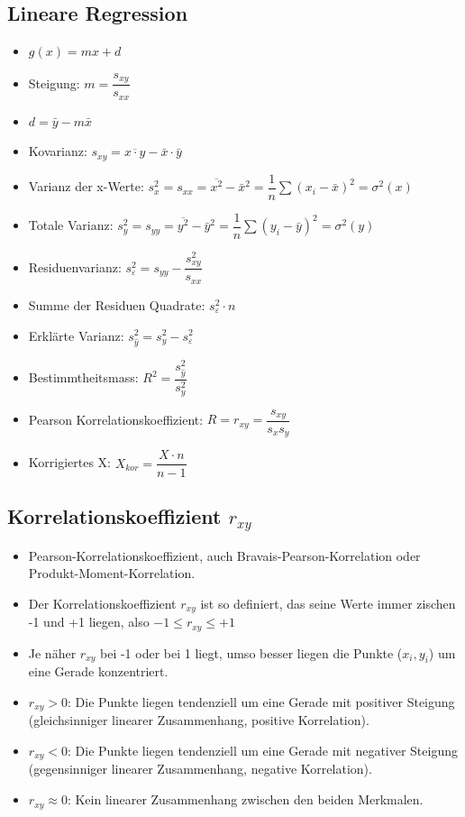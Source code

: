 \documentclass[8pt,a4paper]{scrartcl}
\begin{document}
\begin{multicols*}{3}
			\subsection{Lineare Regression}
				\begin{itemize}\itemsep0pt				
					\item $g(x) = mx + d$
					\item Steigung: $m = \dfrac{s_{xy}}{s_{xx}}$
					\item $d = \bar{y} - m\bar{x}$
					\item Kovarianz: $s_{xy} = \overline{x \cdot y} - \bar{x} \cdot \bar{y}$
					\item Varianz der x-Werte: $s_{x}^{2}=s_{xx} = \overline{x^{2}} - \bar{x}^{2} = \dfrac{1}{n}\sum(x_{i}-\bar{x})^{2}  = \sigma^{2}(x)$
					\item Totale Varianz: $s_{y}^{2}=s_{yy} = \overline{y^{2}} - \bar{y}^{2}=  \dfrac{1}{n}\sum(y_{i}-\bar{y})^{2} = \sigma^{2}(y)$
					\item Residuenvarianz: $s_{\varepsilon}^{2} = s_{yy}-\dfrac{s_{xy}^{2}}{s_{xx}}$
					\item Summe der Residuen Quadrate: $s_{\varepsilon}^{2}\cdot n$
					\item Erklärte Varianz: $s_{\hat{y}}^{2}=s_{y}^{2}-s_{\varepsilon}^{2} $
					\item Bestimmtheitsmass: $R^{2}=\dfrac{s_{\hat{y}}^{2}}{s_{y}^{2}}$
					\item Pearson Korrelationskoeffizient: $R=r_{xy}=\dfrac{s_{xy}}{s_{x}s_{y}}$
					\item Korrigiertes X: $X_{kor} = \dfrac{X\cdot n}{n-1}$
				\end{itemize}
				
			\subsection{Korrelationskoeffizient $r_{xy}$}		
				\begin{itemize}\itemsep0pt				
					\item Pearson-Korrelationskoeffizient, auch Bravais-Pearson-Korrelation oder Produkt-Moment-Korrelation.
					\item Der Korrelationskoeffizient $r_{xy}$ ist so definiert, das seine Werte immer zischen -1 und +1 liegen, also $-1 \leq r_{xy} \leq +1$
					\item Je näher $r_{xy}$ bei -1 oder bei 1 liegt, umso besser liegen die Punkte ($x_{i}, y_{i}$) um eine Gerade konzentriert.
					\item $r_{xy} > 0$: Die Punkte liegen tendenziell um eine Gerade mit positiver Steigung (gleichsinniger linearer Zusammenhang, positive Korrelation).
					\item $r_{xy} < 0$: Die Punkte liegen tendenziell um eine Gerade mit negativer Steigung (gegensinniger linearer Zusammenhang, negative Korrelation).
					\item $r_{xy} \approx 0$: Kein linearer Zusammenhang zwischen den beiden Merkmalen.
				\end{itemize}				
				

\end{multicols*}
\end{document}
